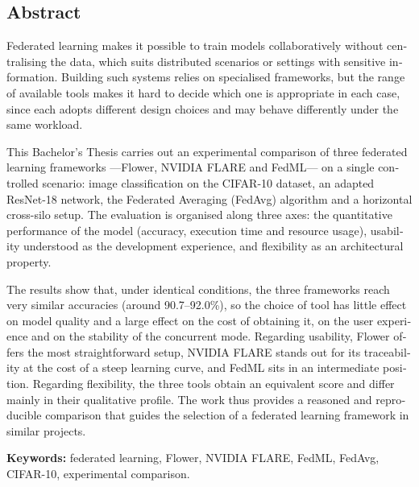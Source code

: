 \cleardoublepage

\begin{otherlanguage}{english}
\chapter*{Abstract}

Federated learning makes it possible to train models collaboratively without centralising the data, which suits distributed scenarios or settings with sensitive information. Building such systems relies on specialised frameworks, but the range of available tools makes it hard to decide which one is appropriate in each case, since each adopts different design choices and may behave differently under the same workload.

This Bachelor's Thesis carries out an experimental comparison of three federated learning frameworks —Flower, NVIDIA FLARE and FedML— on a single controlled scenario: image classification on the CIFAR-10 dataset, an adapted ResNet-18 network, the Federated Averaging (FedAvg) algorithm and a horizontal cross-silo setup. The evaluation is organised along three axes: the quantitative performance of the model (accuracy, execution time and resource usage), usability understood as the development experience, and flexibility as an architectural property.

The results show that, under identical conditions, the three frameworks reach very similar accuracies (around 90.7--92.0\%), so the choice of tool has little effect on model quality and a large effect on the cost of obtaining it, on the user experience and on the stability of the concurrent mode. Regarding usability, Flower offers the most straightforward setup, NVIDIA FLARE stands out for its traceability at the cost of a steep learning curve, and FedML sits in an intermediate position. Regarding flexibility, the three tools obtain an equivalent score and differ mainly in their qualitative profile. The work thus provides a reasoned and reproducible comparison that guides the selection of a federated learning framework in similar projects.

\textbf{Keywords:} federated learning, Flower, NVIDIA FLARE, FedML, FedAvg, CIFAR-10, experimental comparison.

\end{otherlanguage}

\cleardoublepage
